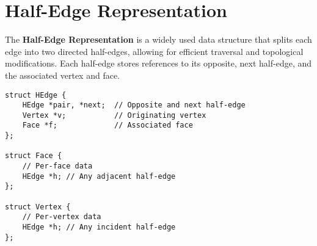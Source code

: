 \section{Half-Edge Representation}
\label{app:half-edge-representation}

The \textbf{Half-Edge Representation} is a widely used data structure that splits each edge into two directed half-edges, allowing for efficient traversal and topological modifications. Each half-edge stores references to its opposite, next half-edge, and the associated vertex and face.

\begin{verbatim}
struct HEdge {
    HEdge *pair, *next;  // Opposite and next half-edge
    Vertex *v;           // Originating vertex
    Face *f;             // Associated face
};

struct Face {
    // Per-face data
    HEdge *h; // Any adjacent half-edge
};

struct Vertex {
    // Per-vertex data
    HEdge *h; // Any incident half-edge
};
\end{verbatim}

\resumetoc